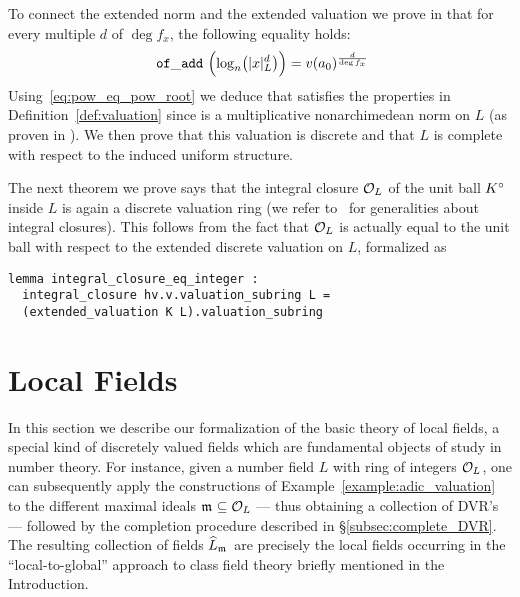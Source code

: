\documentclass[sigplan,10pt, nonacm, review]{acmart}
\begin{document}
To connect the extended norm and the extended valuation we prove in \href{https://github.com/LCFT-Lean/local_fields/blob/76ad487d09babdb0018f394a5634526637ee014a/src/discrete_valuation_ring/discrete_norm.lean#L153}{\extlink} that for every multiple $d$ of $\deg f_x$, the following equality holds:
\begin{equation}\label{eq:pow_eq_pow_root}
\mathtt{\ of\_add\ }
\Bigl(\log_n\bigl(\lvert x\rvert_L^{d}\bigr)\Bigr)=v(a_0)^\frac{d}{\deg f_x}
\end{equation}
Using~\eqref{eq:pow_eq_pow_root} we deduce that  satisfies the properties in Definition~\ref{def:valuation} since  is a multiplicative nonarchimedean norm on $L$ (as proven in \cite[\S3.2]{deF23}). We then prove that this valuation is discrete\href{https://github.com/LCFT-Lean/local_fields/blob/76ad487d09babdb0018f394a5634526637ee014a/src/discrete_valuation_ring/extensions.lean#L443}{\extlink} and that  $L$ is complete with respect to the induced uniform structure\href{https://github.com/LCFT-Lean/local_fields/blob/76ad487d09babdb0018f394a5634526637ee014a/src/discrete_valuation_ring/extensions.lean#L557}{\extlink}. 

The next theorem we prove says that the integral closure $\mathcal{O}_{L}$ of the unit ball ${K}^\circ$ inside $L$ is again a discrete valuation ring\href{https://github.com/LCFT-Lean/local_fields/blob/76ad487d09babdb0018f394a5634526637ee014a/src/discrete_valuation_ring/extensions.lean#L612}{\extlink} (we refer to~\cite[Chapitre~5, \S2, n$^\circ$1]{Bou85} for generalities about integral closures). This follows from the fact that $\mathcal{O}_{L}$ is actually equal to the unit ball with respect to the extended discrete valuation on $L$, formalized as\href{https://github.com/LCFT-Lean/local_fields/blob/76ad487d09babdb0018f394a5634526637ee014a/src/discrete_valuation_ring/extensions.lean#L584}{\extlink}
\begin{lstlisting}
lemma integral_closure_eq_integer :
  integral_closure hv.v.valuation_subring L =
  (extended_valuation K L).valuation_subring
\end{lstlisting}

\section{Local Fields}\label{sec:local_fields}
In this section we describe our formalization of the basic theory of local fields, a special kind of discretely valued fields which are fundamental objects of study in number theory. For instance, given a number field $L$ with ring of integers $\mathcal{O}_{L}$, one can subsequently apply the constructions of Example~\ref{example:adic_valuation} to the different maximal ideals $\maxid[\empty]\subseteq\rint{L}$ --- thus obtaining a collection of DVR's --- followed by the completion procedure described in \S\ref{subsec:complete_DVR}. The resulting collection of fields $\compl[{\maxid[\empty]}]{L}$ are precisely the local fields occurring in the ``local-to-global'' approach to class field theory briefly mentioned in the Introduction.
\end{document}
